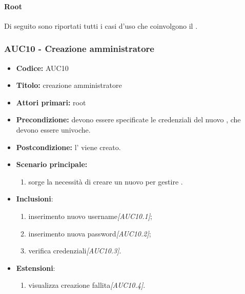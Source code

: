 \documentclass[casi-duso]{subfiles}
\begin{document}
\paragraph{Root}
Di seguito sono riportati tutti i casi d'uso che coinvolgono il  .

\subsubsection{AUC10 - Creazione amministratore}
\label{subsub:AUC10}
\begin{itemize}
  \item \textbf{Codice:} AUC10
  \item \textbf{Titolo:} creazione amministratore
  \item \textbf{Attori primari:} root
  \item \textbf{Precondizione:} devono essere specificate le credenziali del nuovo , che devono essere univoche.
  \item \textbf{Postcondizione:} l' viene creato.
  \item \textbf{Scenario principale:} 
  \begin{enumerate}
    \item sorge la necessità di creare un nuovo  per gestire .
  \end{enumerate}
  \item \textbf{Inclusioni}:
  \begin{enumerate}
    \item inserimento nuovo username\emph{[AUC10.1]};
    \item inserimento nuova password\emph{[AUC10.2]};
    \item verifica credenziali\emph{[AUC10.3]}.
  \end{enumerate}
  \item \textbf{Estensioni}:
  \begin{enumerate}
    \item  visualizza creazione fallita\emph{[AUC10.4]}.
  \end{enumerate}
\end{itemize}
\end{document}
